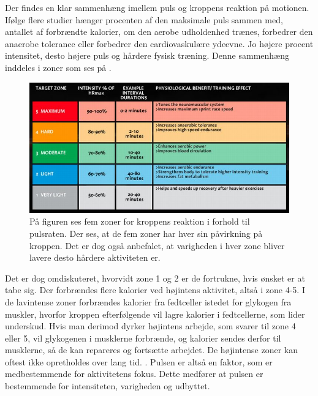 Der findes en klar sammenhæng imellem puls og kroppens reaktion på motionen. Ifølge flere studier hænger procenten af den maksimale puls sammen med, antallet af forbrændte kalorier, om den aerobe udholdenhed trænes, forbedrer den anaerobe tolerance eller forbedrer den cardiovaskulære ydeevne. Jo højere procent intensitet, desto højere puls og hårdere fysisk træning. Denne sammenhæng inddeles i zoner som ses på . \citep{Leyland2007,Heartratejournal2015}
\begin{figure}[H]
	\centering
	\includegraphics[scale=0.75]{figures/aProblemanalyse/heart-rate-zones.jpg}
	\caption{På figuren ses fem zoner for kroppens reaktion i forhold til pulsraten. Der ses, at de fem zoner har hver sin påvirkning på kroppen. Det er dog også anbefalet, at varigheden i hver zone bliver lavere desto hårdere aktiviteten er. \citep{Heartratejournal2015}}
	\label{fig:PA_Procentpuls}
\end{figure}

Det er dog omdiskuteret, hvorvidt zone 1 og 2 er de fortrukne, hvis ønsket er at tabe sig. Der forbrændes flere kalorier ved højintens aktivitet, altså i zone 4-5. I de lavintense zoner forbrændes kalorier fra fedtceller istedet for glykogen fra muskler, hvorfor kroppen efterfølgende vil lagre kalorier i fedtcellerne, som lider underskud. Hvis man derimod dyrker højintens arbejde, som svarer til zone 4 eller 5, vil glykogenen i musklerne forbrænde, og kalorier sendes derfor til musklerne, så de kan repareres og fortsætte arbejdet. De højintense zoner kan oftest ikke opretholdes over lang tid.  \citep{Martini2012,Leyland2007,Heartratejournal2015}. \newline
Pulsen er altså en faktor, som er medbestemmende for aktivitetens fokus. Dette medfører at pulsen er bestemmende for intensiteten, varigheden og udbyttet.

